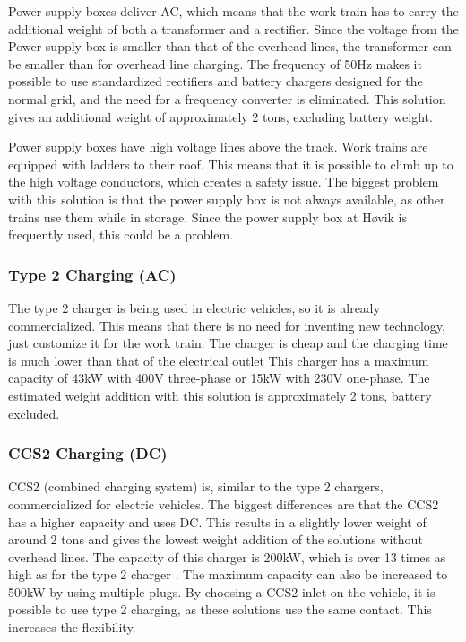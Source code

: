 \documentclass{article}
\begin{document}
Power supply boxes deliver AC, which means that the work train has to carry the additional weight of both a transformer and a rectifier. Since the voltage from the Power supply box is smaller than that of the overhead lines, the transformer can be smaller than for overhead line charging\cite{sweco}. The frequency of 50Hz makes it possible to use standardized rectifiers and battery chargers designed for the normal grid, and the need for a frequency converter is eliminated. This solution gives an additional weight of approximately 2 tons, excluding battery weight\cite{sweco}.

Power supply boxes have high voltage lines above the track. Work trains are equipped with ladders to their roof. This means that it is possible to climb up to the high voltage conductors, which creates a safety issue. The biggest problem with this solution is that the power supply box is not always available, as other trains use them while in storage. Since the power supply box at Høvik is frequently used, this could be a problem.

\subsubsection*{Type 2 Charging (AC)}

The type 2 charger is being used in electric vehicles, so it is already commercialized. This means that there is no need for inventing new technology, just customize it for the work train. The charger is cheap and the charging time is much lower than that of the electrical outlet \cite{normallading} %
This charger has a maximum capacity of 43kW with 400V three-phase or 15kW with 230V one-phase\cite{sweco}. The estimated weight addition with this solution is approximately 2 tons, battery excluded\cite{sweco}.

\subsubsection*{CCS2 Charging (DC)}

CCS2 (combined charging system) is, similar to the type 2 chargers, commercialized for electric vehicles. The biggest differences are that the CCS2 has a higher capacity and uses DC. This results in a slightly lower weight of around 2 tons and gives the lowest weight addition of the solutions without overhead lines\cite{sweco}. The capacity of this charger is 200kW, which is over 13 times as high as for the type 2 charger \cite{sweco}. The maximum capacity can also be increased to 500kW by using multiple plugs. By choosing a CCS2 inlet on the vehicle, it is possible to use type 2 charging, as these solutions use the same contact\cite{sweco}. This increases the flexibility.
\end{document}
